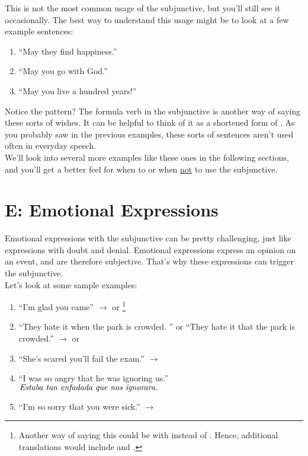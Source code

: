 This is not the most common usage of the subjunctive, but you'll still see it occasionally. The best way to understand this usage might be to look at a few example sentences:

\begin{enumerate}[noitemsep]
	\item ``May they find happiness.'' \arr {}
	\item ``May you go with God.'' \arr {}
	\item ``May you live a hundred years!'' \arr {}
\end{enumerate}

Notice the pattern? The formula  verb in the subjunctive is another way of saying these sorts of wishes. It can be helpful to think of it as a shortened form of . As you probably saw in the previous examples, these sorts of sentences aren't used often in everyday speech.\\ 

We'll look into several more examples like these ones in the following sections, and you'll get a better feel for when to or when \underline{not} to use the subjunctive.
\section{E: Emotional Expressions}
Emotional expressions with the subjunctive can be pretty challenging, just like expressions with doubt and denial. Emotional expressions express an opinion on an event, and are therefore subjective. That's why these expressions can trigger the subjunctive. \\

Let's look at some sample examples: 
\begin{enumerate}[noitemsep]
	\item ``I'm glad you came'' $\rightarrow$  or  \footnote{Another way of saying this could be with  instead of .  Hence, additional translations would include  and .}
	\item ``They hate it when the park is crowded. '' or ``They hate it that the park is crowded.'' $\rightarrow$  or 
	\item ``She's scared you'll fail the exam.'' $\rightarrow$ 
	\item ``I was so angry that he was ignoring us.'' $\textit{Estaba tan enfadada que nos ignorara.}$
	\item ``I'm so sorry that you were sick.'' $\rightarrow$ 
\end{enumerate}

